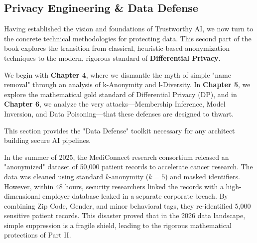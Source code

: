 % 
%

\begin{partbacktext}
\part{Privacy Engineering \& Data Defense}
\noindent Having established the vision and foundations of Trustworthy AI, we now turn to the concrete technical methodologies for protecting data. This second part of the book explores the transition from classical, heuristic-based anonymization techniques to the modern, rigorous standard of \textbf{Differential Privacy}.

We begin with \textbf{Chapter 4}, where we dismantle the myth of simple "name removal" through an analysis of k-Anonymity and l-Diversity. In \textbf{Chapter 5}, we explore the mathematical gold standard of Differential Privacy (DP), and in \textbf{Chapter 6}, we analyze the very attacks—Membership Inference, Model Inversion, and Data Poisoning—that these defenses are designed to thwart. 

This section provides the "Data Defense" toolkit necessary for any architect building secure AI pipelines.

\begin{casestudy} 
In the summer of 2025, the MediConnect research consortium released an "anonymized" dataset of 50,000 patient records to accelerate cancer research. The data was cleaned using standard $k$-anonymity ($k=5$) and masked identifiers. However, within 48 hours, security researchers linked the records with a high-dimensional employer database leaked in a separate corporate breach. By combining Zip Code, Gender, and minor behavioral tags, they re-identified 5,000 sensitive patient records. This disaster proved that in the 2026 data landscape, simple suppression is a fragile shield, leading to the rigorous mathematical protections of Part II. 
\end{casestudy} 
\end{partbacktext}
